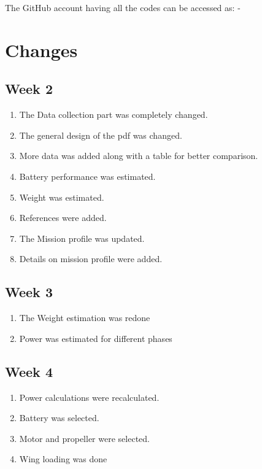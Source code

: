 \documentclass[12 pt]{article}
\begin{document}



\vspace{10 pt}

The GitHub account having all the codes can be accessed as: - 

\href{https://github.com/abhijeetmangela/Group_7_design.git}{}

\newpage

\section{Changes}

\subsection{Week 2}
\begin{enumerate}
    \item The Data collection part was completely changed.
    \item The general design of the pdf was changed.
    \item More data was added along with a table for better comparison.
    \item Battery performance was estimated.
    \item Weight was estimated.
    \item References were added.
    \item The Mission profile was updated.
    \item Details on mission profile were added.
\end{enumerate}

\subsection{Week 3}
\begin{enumerate}
    \item The Weight estimation was redone
    \item Power was estimated for different phases 
\end{enumerate}

\subsection{Week 4}
\begin{enumerate}
    \item Power calculations were recalculated.
    \item Battery was selected.
    \item Motor and propeller were selected.
    \item Wing loading was done
\end{enumerate}
\end{document}
